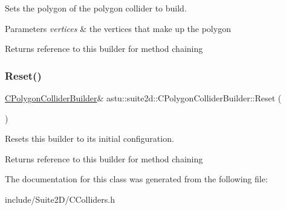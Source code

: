 Sets the polygon of the polygon collider to build.


\begin{DoxyParams}{Parameters}
{\em vertices} & the vertices that make up the polygon \\
\hline
\end{DoxyParams}
\begin{DoxyReturn}{Returns}
reference to this builder for method chaining 
\end{DoxyReturn}
\mbox{\label{classastu_1_1suite2d_1_1CPolygonColliderBuilder_ac8d3cf69f1fc687ab4aef32aa12383df}} 
\subsubsection{\texorpdfstring{Reset()}{Reset()}}
{\footnotesize\ttfamily \hyperlink{classastu_1_1suite2d_1_1CPolygonColliderBuilder}{C\+Polygon\+Collider\+Builder}\& astu\+::suite2d\+::\+C\+Polygon\+Collider\+Builder\+::\+Reset (\begin{DoxyParamCaption}{ }\end{DoxyParamCaption})\hspace{0.3cm}{\ttfamily [inline]}}

Resets this builder to its initial configuration.

\begin{DoxyReturn}{Returns}
reference to this builder for method chaining 
\end{DoxyReturn}


The documentation for this class was generated from the following file\+:\begin{DoxyCompactItemize}
\item 
include/\+Suite2\+D/C\+Colliders.\+h\end{DoxyCompactItemize}
